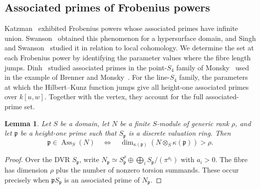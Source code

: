 \documentclass[11pt,a4paper,reqno]{amsart}
\numberwithin{equation}{section}
\theoremstyle{plain}
\newtheorem{lemma}[theorem]{Lemma}
\theoremstyle{definition}
\theoremstyle{remark}
\DeclareMathOperator{\Ass}{Ass}
\begin{document}
\subsection{Associated primes of Frobenius powers}
\label{subsec:ass}
Katzman~\cite{KatzAss} exhibited Frobenius powers whose associated
primes have infinite union. Swanson~\cite{SwaInf} obtained this
phenomenon for a hypersurface domain, and Singh and Swanson~\cite{SinghSwa}
studied it in relation to local cohomology. We determine the set at
each Frobenius power by identifying the parameter values where the fibre
length jumps. Dinh~\cite{DinhAss} studied associated primes in the
point-$S_4$ family of Monsky~\cite{MonskyPoint} used in the example of Brenner and Monsky~\cite{BM}. For the line-$S_4$ family,
the parameters at which the Hilbert--Kunz function jumps give all
height-one associated primes over $k[u,w]$. Together with the vertex,
they account for the full associated-prime set.

\begin{lemma}\label{lem:fibre-torsion}
Let $S$ be a domain, let $N$ be a finite $S$-module of generic rank
$\rho$, and let $\mathfrak p$ be a height-one prime such that
$S_{\mathfrak p}$ is a discrete valuation ring. Then
\[
\mathfrak p\in\Ass_S(N)
\quad\Longleftrightarrow\quad
\dim_{\kappa(\mathfrak p)}(N\otimes_S\kappa(\mathfrak p))>\rho.
\]
\end{lemma}
\begin{proof}
Over the DVR $S_{\mathfrak p}$, write
$N_{\mathfrak p}\simeq S_{\mathfrak p}^{\rho}
\oplus\bigoplus_i S_{\mathfrak p}/(\pi^{a_i})$
with $a_i>0$. The fibre has dimension $\rho$ plus the number of
nonzero torsion summands. These occur precisely when
$\mathfrak pS_{\mathfrak p}$ is an associated prime of
$N_{\mathfrak p}$.
\end{proof}
\end{document}
